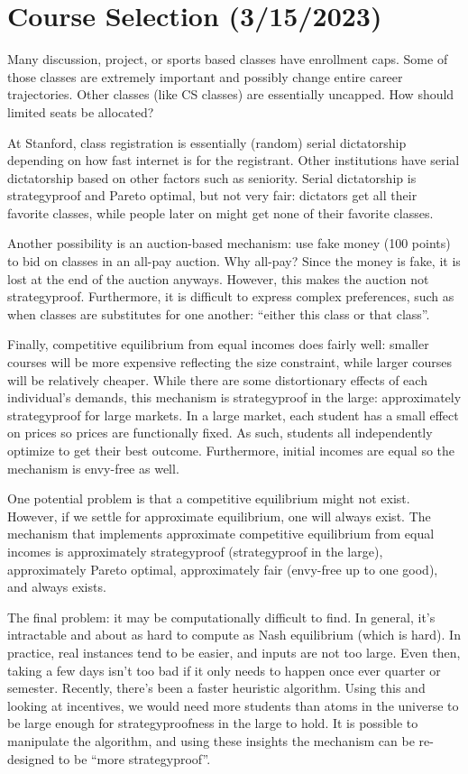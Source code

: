 \documentclass[dvipsnames]{article}
\theoremstyle{definition}
\theoremstyle{remark}
\begin{document}
\newpage

\section{Course Selection (3/15/2023)}

Many discussion, project, or sports based classes have enrollment caps. Some of those classes are extremely important and possibly change entire career trajectories. Other classes (like CS classes) are essentially uncapped. How should limited seats be allocated?

At Stanford, class registration is essentially (random) serial dictatorship depending on how fast internet is for the registrant. Other institutions have serial dictatorship based on other factors such as seniority. Serial dictatorship is strategyproof and Pareto optimal, but not very fair: dictators get all their favorite classes, while people later on might get none of their favorite classes. 

Another possibility is an auction-based mechanism: use fake money (100 points) to bid on classes in an all-pay auction. Why all-pay? Since the money is fake, it is lost at the end of the auction anyways. However, this makes the auction not strategyproof. Furthermore, it is difficult to express complex preferences, such as when classes are substitutes for one another: ``either this class or that class''.

Finally, competitive equilibrium from equal incomes does fairly well: smaller courses will be more expensive reflecting the size constraint, while larger courses will be relatively cheaper. While there are some distortionary effects of each individual's demands, this mechanism is strategyproof in the large: approximately strategyproof for large markets. In a large market, each student has a small effect on prices so prices are functionally fixed. As such, students all independently optimize to get their best outcome. Furthermore, initial incomes are equal so the mechanism is envy-free as well.

One potential problem is that a competitive equilibrium might not exist. However, if we settle for approximate equilibrium, one will always exist. The mechanism that implements approximate competitive equilibrium from equal incomes is approximately strategyproof (strategyproof in the large), approximately Pareto optimal, approximately fair (envy-free up to one good), and always exists.

The final problem: it may be computationally difficult to find. In general, it's intractable and about as hard to compute as Nash equilibrium (which is hard). In practice, real instances tend to be easier, and inputs are not too large. Even then, taking a few days isn't too bad if it only needs to happen once ever quarter or semester. Recently, there's been a faster heuristic algorithm. Using this and looking at incentives, we would need more students than atoms in the universe to be large enough for strategyproofness in the large to hold. It is possible to manipulate the algorithm, and using these insights the mechanism can be re-designed to be ``more strategyproof''.
\end{document}
